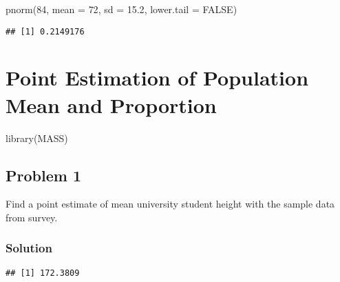 \documentclass[
]{article}
\newenvironment{Shaded}{\begin{snugshade}}{\end{snugshade}}
\newcommand{\AttributeTok}[1]{\textcolor[rgb]{0.77,0.63,0.00}{#1}}
\newcommand{\ConstantTok}[1]{\textcolor[rgb]{0.00,0.00,0.00}{#1}}
\newcommand{\DecValTok}[1]{\textcolor[rgb]{0.00,0.00,0.81}{#1}}
\newcommand{\FloatTok}[1]{\textcolor[rgb]{0.00,0.00,0.81}{#1}}
\newcommand{\FunctionTok}[1]{\textcolor[rgb]{0.00,0.00,0.00}{#1}}
\newcommand{\NormalTok}[1]{#1}
\newcommand{\OtherTok}[1]{\textcolor[rgb]{0.56,0.35,0.01}{#1}}
\newcommand{\SpecialCharTok}[1]{\textcolor[rgb]{0.00,0.00,0.00}{#1}}
\begin{document}
\begin{Shaded}
\begin{Highlighting}[]
\FunctionTok{pnorm}\NormalTok{(}\DecValTok{84}\NormalTok{, }\AttributeTok{mean =} \DecValTok{72}\NormalTok{, }\AttributeTok{sd =} \FloatTok{15.2}\NormalTok{, }\AttributeTok{lower.tail =} \ConstantTok{FALSE}\NormalTok{)}
\end{Highlighting}
\end{Shaded}

\begin{verbatim}
## [1] 0.2149176
\end{verbatim}

\hypertarget{point-estimation-of-population-mean-and-proportion}{%
\section{Point Estimation of Population Mean and
Proportion}\label{point-estimation-of-population-mean-and-proportion}}

\begin{Shaded}
\begin{Highlighting}[]
\FunctionTok{library}\NormalTok{(MASS)}
\end{Highlighting}
\end{Shaded}

\hypertarget{problem-1-1}{%
\subsection{Problem 1}\label{problem-1-1}}

Find a point estimate of mean university student height with the sample
data from survey.

\hypertarget{solution-5}{%
\subsubsection{Solution}\label{solution-5}}

\begin{Shaded}
\end{Shaded}

\begin{verbatim}
## [1] 172.3809
\end{verbatim}
\end{document}
